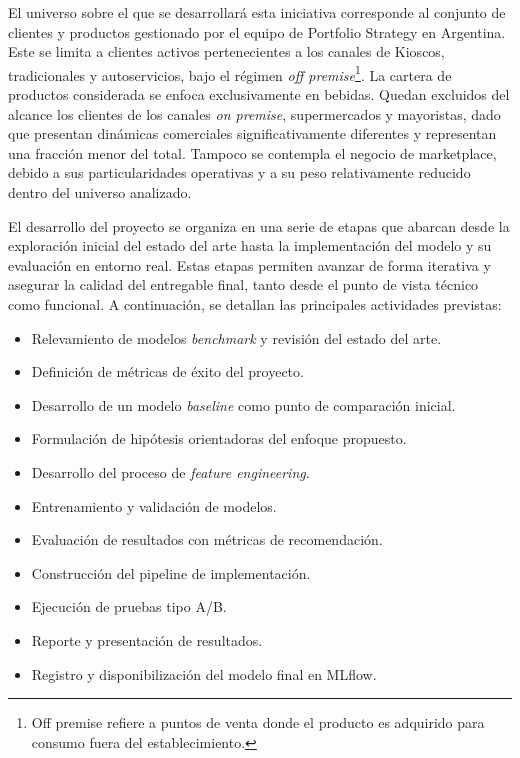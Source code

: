 \documentclass[
11pt, %
]{charter}
\begin{document}
El universo sobre el que se desarrollará esta iniciativa corresponde al conjunto de clientes y productos gestionado por el equipo de Portfolio Strategy en Argentina. Este se limita a clientes activos pertenecientes a los canales de Kioscos, tradicionales y autoservicios, bajo el régimen \textit{off premise}\footnote{Off premise refiere a puntos de venta donde el producto es adquirido para consumo fuera del establecimiento.}. La cartera de productos considerada se enfoca exclusivamente en bebidas. Quedan excluidos del alcance los clientes de los canales \textit{on premise}, supermercados y mayoristas, dado que presentan dinámicas comerciales significativamente diferentes y representan una fracción menor del total. Tampoco se contempla el negocio de marketplace, debido a sus particularidades operativas y a su peso relativamente reducido dentro del universo analizado.

El desarrollo del proyecto se organiza en una serie de etapas que abarcan desde la exploración inicial del estado del arte hasta la implementación del modelo y su evaluación en entorno real. Estas etapas permiten avanzar de forma iterativa y asegurar la calidad del entregable final, tanto desde el punto de vista técnico como funcional. A continuación, se detallan las principales actividades previstas:

\begin{itemize}
\item Relevamiento de modelos \textit{benchmark} y revisión del estado del arte.
\item Definición de métricas de éxito del proyecto.
\item Desarrollo de un modelo \textit{baseline} como punto de comparación inicial.
\item Formulación de hipótesis orientadoras del enfoque propuesto.
\item Desarrollo del proceso de \textit{feature engineering}.
\item Entrenamiento y validación de modelos.
\item Evaluación de resultados con métricas de recomendación.
\item Construcción del pipeline de implementación.
\item Ejecución de pruebas tipo A/B.
\item Reporte y presentación de resultados.
\item Registro y disponibilización del modelo final en MLflow.
\end{itemize}
\end{document}
